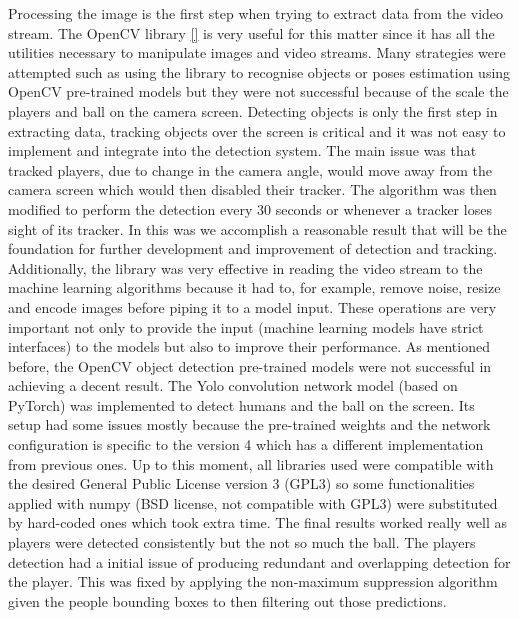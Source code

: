 \documentclass[
11pt,
twoside
]{report}
\begin{document}
Processing the image is the first step when trying to extract data from the video stream. The OpenCV library \ref{} is very useful for this matter since it has all the utilities necessary to manipulate images and video streams. Many strategies were attempted such as using the library to recognise objects or poses estimation using OpenCV pre-trained models but they were not successful because of the scale the players and ball on the camera screen. Detecting objects is only the first step in extracting data, tracking objects over the screen is critical and it was not easy to implement and integrate into the detection system. The main issue was that tracked players, due to change in the camera angle, would move away from the camera screen which would then disabled their tracker. The algorithm was then modified to perform the detection every 30 seconds or whenever a tracker loses sight of its tracker. In this was we accomplish a reasonable result that will be the foundation for further development and improvement of detection and tracking. Additionally, the library was very effective in reading the video stream to the machine learning algorithms because it had to, for example, remove noise, resize and encode images before piping it to a model input. These operations are very important not only to provide the input (machine learning models have strict interfaces) to the models but also to improve their performance.
As mentioned before, the OpenCV object detection pre-trained models were not successful in achieving a decent result. The Yolo convolution network model (based on PyTorch) was implemented to detect humans and the ball on the screen. Its setup had some issues mostly because the pre-trained weights and the network configuration is specific to the version 4 which has a different implementation from previous ones. Up to this moment, all libraries used were compatible with the desired General Public License version 3 (GPL3) so some functionalities applied with numpy (BSD license, not compatible with GPL3) were substituted by hard-coded ones which took extra time. The final results worked really well as players were detected consistently but the not so much the ball. The players detection had a initial issue of producing redundant and overlapping detection for the player. This was fixed by applying the non-maximum suppression algorithm given the people bounding boxes to then filtering out those predictions.
\end{document}
